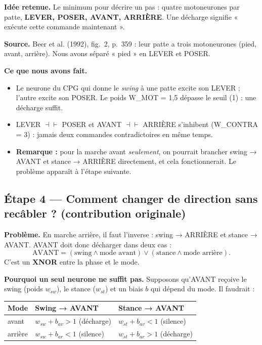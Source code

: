 \documentclass[11pt]{article}
\newcommand{\champ}[2]{\par\noindent\textbf{\color{bleu}#1} #2\par}
\begin{document}
\champ{Idée retenue.}{Le minimum pour décrire un pas : quatre motoneurones par patte,
\textbf{LEVER, POSER, AVANT, ARRIÈRE}. Une décharge signifie « exécute cette commande
maintenant ».}
\champ{Source.}{Beer et al. (1992), fig.~2, p.~359 \cite{beer1992} : leur patte a trois
motoneurones (pied, avant, arrière). Nous avons séparé « pied » en LEVER et POSER.}
\champ{Ce que nous avons fait.}{}
\begin{itemize}
  \item Le neurone du CPG qui donne le \emph{swing} à une patte excite son LEVER ; l'autre excite
        son POSER. Le poids W\_MOT = 1,5 dépasse le seuil (1) : une décharge suffit.
  \item LEVER $\dashv\vdash$ POSER et AVANT $\dashv\vdash$ ARRIÈRE s'inhibent (W\_CONTRA = 3) : jamais deux commandes
        contradictoires en même temps.
  \item \textbf{Remarque :} pour la marche avant \emph{seulement}, on pourrait brancher
        swing → AVANT et stance → ARRIÈRE directement, et cela fonctionnerait. Le problème
        apparaît à l'étape suivante.
\end{itemize}

\subsection*{Étape 4 --- Comment changer de direction sans recâbler ? (contribution originale)}

\champ{Problème.}{En marche arrière, il faut l'inverse : swing → ARRIÈRE et stance → AVANT.
AVANT doit donc décharger dans deux cas :
\[ \text{AVANT} = (\text{swing} \wedge \text{mode avant}) \vee (\text{stance} \wedge \text{mode arrière}) . \]
C'est un \textbf{XNOR} entre la phase et le mode.}

\champ{Pourquoi un seul neurone ne suffit pas.}{Supposons qu'AVANT reçoive le swing (poids
$w_{sw}$), le stance ($w_{st}$) et un biais $b$ qui dépend du mode. Il faudrait :}

\begin{center}
\begin{tabular}{lll}
  \toprule
  \textbf{Mode} & \textbf{Swing → AVANT} & \textbf{Stance → AVANT}\\ \midrule
  avant   & $w_{sw} + b_{av} > 1$ (décharge) & $w_{st} + b_{av} < 1$ (silence)\\
  arrière & $w_{sw} + b_{ar} < 1$ (silence)  & $w_{st} + b_{ar} > 1$ (décharge)\\ \bottomrule
\end{tabular}
\end{center}
\end{document}
